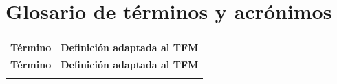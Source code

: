 
\chapter*{Glosario de términos y acrónimos}

\small
\setlength{\LTpre}{0pt}
\setlength{\LTpost}{0pt}
\renewcommand{\arraystretch}{1.18}

\begin{longtable}{@{}>{\raggedright\arraybackslash\bfseries}p{}>{\raggedright\arraybackslash}p{}@{}}
\toprule
\textbf{Término} & \textbf{Definición adaptada al TFM} \\
\midrule
\endfirsthead
\toprule
\textbf{Término} & \textbf{Definición adaptada al TFM} \\
\midrule
\endhead
\bottomrule
\endlastfoot


\end{longtable}
